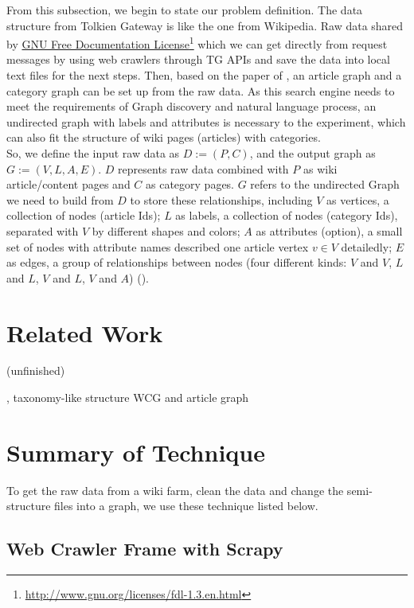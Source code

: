 From this subsection, we begin to state our problem definition. The data structure from Tolkien Gateway is like the one from Wikipedia. Raw data shared by \href{http://www.gnu.org/licenses/fdl-1.3.en.html}{GNU Free Documentation License}\footnote{\href{http://www.gnu.org/licenses/fdl-1.3.en.html}{http://www.gnu.org/licenses/fdl-1.3.en.html}} which we can get directly from request messages by using web crawlers through TG APIs and save the data into local text files for the next steps. Then, based on the paper of \cite{zesch2007analysis}, an article graph and a category graph can be set up from the raw data. 
As this search engine needs to meet the requirements of Graph discovery and natural language process, an undirected graph with labels and attributes is necessary to the experiment, which can also fit the structure of wiki pages (articles) with categories. \\
So, we define the input raw data as $D := (P, C)$, and the output graph as $G := (V, L, A, E)$. $D$ represents raw data combined with $P$ as wiki article/content pages and $C$ as category pages. $G$ refers to the undirected Graph we need to build from $D$ to store these relationships, including $V$ as vertices, a collection of nodes (article Ids); $L$ as labels, a collection of nodes (category Ids), separated with $V$ by different shapes and colors; $A$ as attributes (option), a small set of nodes with attribute names described one article vertex $v \in V$ detailedly; $E$ as edges, a group of relationships between nodes (four different kinds: $V$ and $V$, $L$ and $L$, $V$ and $L$, $V$ and $A$) (\cite{newman2003structure}). 

\section{Related Work}
(unfinished)

\label{Ch-2:Sec:Related Work}
\cite{zesch2007analysis}, taxonomy-like structure WCG and article graph
\cite{bibid}

\section{Summary of Technique}
\label{Ch-2:Sec:Summary of Technique}

To get the raw data from a wiki farm, clean the data and change the semi-structure files into a graph, we use these technique listed below.

\subsection{Web Crawler Frame with Scrapy}

